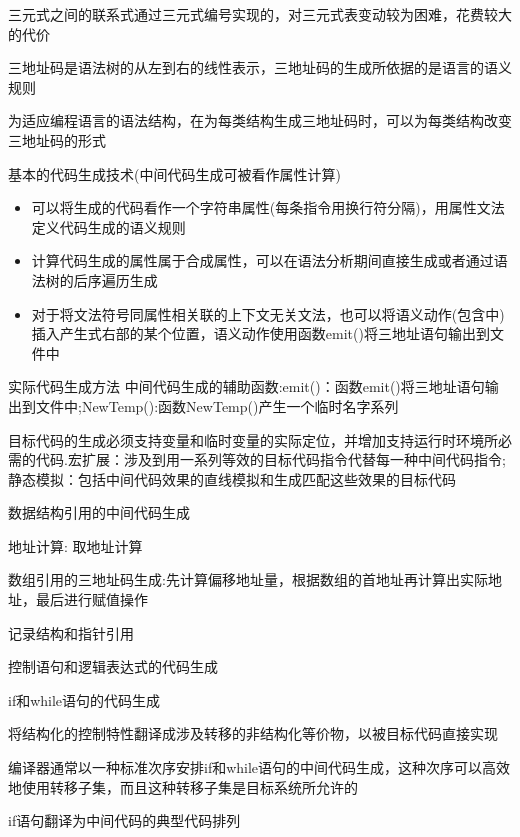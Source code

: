 \documentclass[utf8]{ctexart}
\begin{document}
三元式之间的联系式通过三元式编号实现的，对三元式表变动较为困难，花费较大的代价

三地址码是语法树的从左到右的线性表示，三地址码的生成所依据的是语言的语义规则

为适应编程语言的语法结构，在为每类结构生成三地址码时，可以为每类结构改变三地址码的形式

基本的代码生成技术(中间代码生成可被看作属性计算)
\begin{itemize}
    \item 可以将生成的代码看作一个字符串属性(每条指令用换行符分隔)，用属性文法定义代码生成的语义规则
    \item 计算代码生成的属性属于合成属性，可以在语法分析期间直接生成或者通过语法树的后序遍历生成
    \item 对于将文法符号同属性相关联的上下文无关文法，也可以将语义动作(包含{}中)插入产生式右部的某个位置，语义动作使用函数emit()将三地址语句输出到文件中
\end{itemize}

实际代码生成方法
中间代码生成的辅助函数:emit()：函数emit()将三地址语句输出到文件中;NewTemp():函数NewTemp()产生一个临时名字系列

目标代码的生成必须支持变量和临时变量的实际定位，并增加支持运行时环境所必需的代码.宏扩展：涉及到用一系列等效的目标代码指令代替每一种中间代码指令;
静态模拟：包括中间代码效果的直线模拟和生成匹配这些效果的目标代码

数据结构引用的中间代码生成

地址计算: 取地址计算

数组引用的三地址码生成:先计算偏移地址量，根据数组的首地址再计算出实际地址，最后进行赋值操作

记录结构和指针引用

控制语句和逻辑表达式的代码生成

if和while语句的代码生成

将结构化的控制特性翻译成涉及转移的非结构化等价物，以被目标代码直接实现

编译器通常以一种标准次序安排if和while语句的中间代码生成，这种次序可以高效地使用转移子集，而且这种转移子集是目标系统所允许的

if语句翻译为中间代码的典型代码排列
\end{document}
